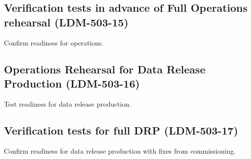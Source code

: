 \subsection{Verification tests in advance of Full Operations rehearsal  \textbf{(LDM-503-15)}\label{LDM-503-15}}
Confirm readiness for operations.
 \newline

\subsection{Operations Rehearsal for Data Release Production  \textbf{(LDM-503-16)}\label{LDM-503-16}}
Test readiness for data release production.
 \newline

\subsection{Verification tests for full DRP \textbf{(LDM-503-17)}\label{LDM-503-17}}
Confirm readiness for data release production  with fixes from commissioning.
 \newline

